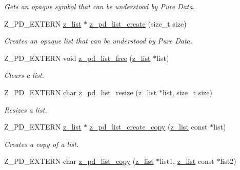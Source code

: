 \begin{DoxyCompactItemize}
\begin{DoxyCompactList}\small\item\em Gets an opaque symbol that can be understood by Pure Data. \end{DoxyCompactList}\item 
\hypertarget{group__zpd_ga8d673c0dc662620ac543ba6c88893571}{Z\-\_\-\-P\-D\-\_\-\-E\-X\-T\-E\-R\-N \hyperlink{struct__list}{z\-\_\-list} $\ast$ \hyperlink{group__zpd_ga8d673c0dc662620ac543ba6c88893571}{z\-\_\-pd\-\_\-list\-\_\-create} (size\-\_\-t size)}\label{group__zpd_ga8d673c0dc662620ac543ba6c88893571}

\begin{DoxyCompactList}\small\item\em Creates an opaque list that can be understood by Pure Data. \end{DoxyCompactList}\item 
\hypertarget{group__zpd_ga1b8c3954e0229d547b2b4e05b76b4271}{Z\-\_\-\-P\-D\-\_\-\-E\-X\-T\-E\-R\-N void \hyperlink{group__zpd_ga1b8c3954e0229d547b2b4e05b76b4271}{z\-\_\-pd\-\_\-list\-\_\-free} (\hyperlink{struct__list}{z\-\_\-list} $\ast$list)}\label{group__zpd_ga1b8c3954e0229d547b2b4e05b76b4271}

\begin{DoxyCompactList}\small\item\em Clears a list. \end{DoxyCompactList}\item 
\hypertarget{group__zpd_ga4f8b319973f379cd8c9c58555e60d892}{Z\-\_\-\-P\-D\-\_\-\-E\-X\-T\-E\-R\-N char \hyperlink{group__zpd_ga4f8b319973f379cd8c9c58555e60d892}{z\-\_\-pd\-\_\-list\-\_\-resize} (\hyperlink{struct__list}{z\-\_\-list} $\ast$list, size\-\_\-t size)}\label{group__zpd_ga4f8b319973f379cd8c9c58555e60d892}

\begin{DoxyCompactList}\small\item\em Resizes a list. \end{DoxyCompactList}\item 
\hypertarget{group__zpd_ga39c851da58b28a6754e671cc0774a5de}{Z\-\_\-\-P\-D\-\_\-\-E\-X\-T\-E\-R\-N \hyperlink{struct__list}{z\-\_\-list} $\ast$ \hyperlink{group__zpd_ga39c851da58b28a6754e671cc0774a5de}{z\-\_\-pd\-\_\-list\-\_\-create\-\_\-copy} (\hyperlink{struct__list}{z\-\_\-list} const $\ast$list)}\label{group__zpd_ga39c851da58b28a6754e671cc0774a5de}

\begin{DoxyCompactList}\small\item\em Creates a copy of a list. \end{DoxyCompactList}\item 
\hypertarget{group__zpd_gada01bb622f17bb8372f13c1c62d8565c}{Z\-\_\-\-P\-D\-\_\-\-E\-X\-T\-E\-R\-N char \hyperlink{group__zpd_gada01bb622f17bb8372f13c1c62d8565c}{z\-\_\-pd\-\_\-list\-\_\-copy} (\hyperlink{struct__list}{z\-\_\-list} $\ast$list1, \hyperlink{struct__list}{z\-\_\-list} const $\ast$list2)}\label{group__zpd_gada01bb622f17bb8372f13c1c62d8565c}


\end{DoxyCompactItemize}
